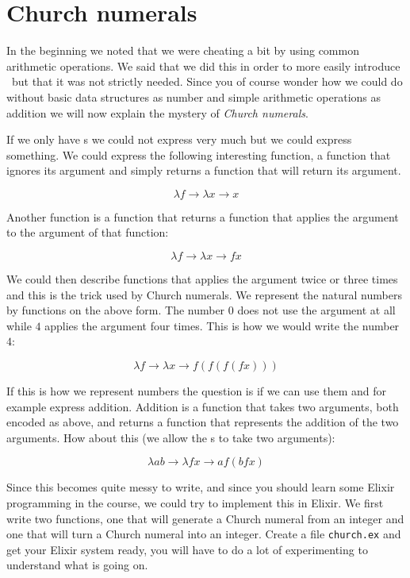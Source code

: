 \documentclass[a4paper,11pt]{article}
\begin{document}
\section{Church numerals}

In the beginning we noted that we were cheating a bit by using common
arithmetic operations. We said that we did this in order to more
easily introduce \lamc\ but that it was not strictly needed. Since you
of course wonder how we could do without basic data structures as
number and simple arithmetic operations as addition we will now
explain the mystery of {\em Church numerals}.

If we only have \lame s we could not express very much but we could
express something. We could express the following interesting
function, a function that ignores its argument and simply returns a
function that will return its argument. 

$$\lambda f \rightarrow \lambda x \rightarrow x$$

Another function is a function that returns a function that applies
the argument to the argument of that function:

$$\lambda f \rightarrow \lambda x \rightarrow f x$$

We could then describe functions that applies the argument twice
or three times and this is the trick used by Church numerals. We
represent the natural numbers by functions on the above form. The number $0$
does not use the argument at all while $4$ applies the argument four
times. This is how we would write the number $4$:

$$\lambda f \rightarrow \lambda x \rightarrow f (f (f (f x)))$$

If this is how we represent numbers the question is if we can
use them and for example express addition. Addition is a
function that takes two arguments, both encoded as above, and returns
a function that represents the addition of the two arguments. How
about this (we allow the \lama s to take two arguments):

$$\lambda a b \rightarrow \lambda f x \rightarrow a f (b f x)$$

Since this becomes quite messy to write, and since you should learn
some Elixir programming in the course, we could try to implement this
in Elixir. We first write two functions, one that will generate a
Church numeral from an integer and one that will turn a Church numeral
into an integer. Create a file {\tt church.ex} and get your Elixir
system ready, you will have to do a lot of experimenting to understand
what is going on.
\end{document}
